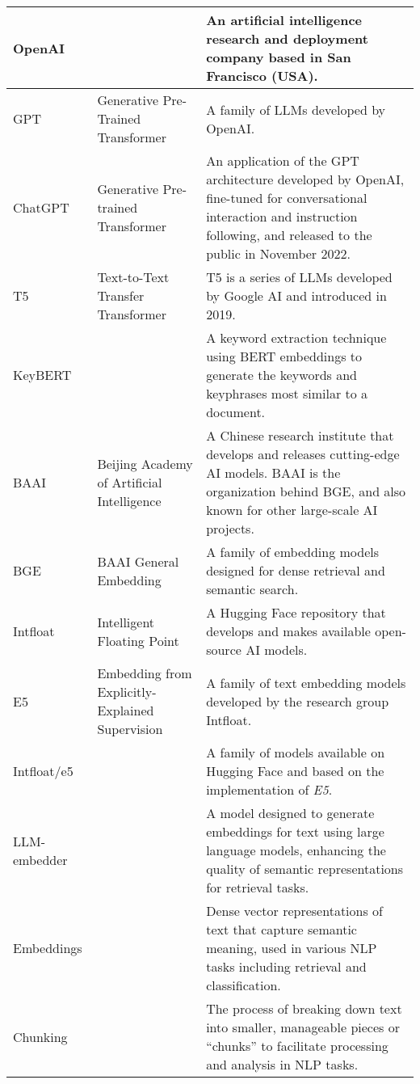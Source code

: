 \begin{tabularx}{\textwidth}{
  >{\raggedright\arraybackslash}p{2.5cm}
  >{\raggedright\arraybackslash}p{4cm}
  >{\noindent\justifying\arraybackslash}X
}
\cmidrule(lr){1-3}
OpenAI & & An artificial intelligence research and deployment company based in San Francisco (USA). \\
\cmidrule(lr){1-3}
GPT   & Generative Pre-Trained Transformer & A family of LLMs developed by OpenAI.\\
\cmidrule(lr){1-3}
ChatGPT & Generative Pre-trained Transformer & An application of the GPT architecture developed by OpenAI, fine-tuned for conversational interaction and instruction following, and released to the public in November 2022. \\
\cmidrule(lr){1-3}
T5    & Text-to-Text Transfer Transformer & T5 is a series of LLMs developed by Google AI and introduced in 2019. \\
\cmidrule(lr){1-3}
KeyBERT & & A keyword extraction technique using BERT embeddings to generate the keywords and keyphrases most similar to a document. \\
\cmidrule(lr){1-3}
BAAI & Beijing Academy of Artificial Intelligence & A Chinese research institute that develops and releases cutting-edge AI models. BAAI is the organization behind BGE, and also known for other large-scale AI projects. \\
\cmidrule(lr){1-3}
BGE   & BAAI General Embedding & A family of embedding models designed for dense retrieval and semantic search. \\
\cmidrule(lr){1-3}
Intfloat & Intelligent Floating Point & A Hugging Face repository that develops and makes available open-source AI models. \\
\cmidrule(lr){1-3}
E5    & Embedding from Explicitly-Explained Supervision & A family of text embedding models developed by the research group Intfloat. \\
\cmidrule(lr){1-3}
Intfloat/e5 & & A family of models available on Hugging Face and based on the implementation of \textit{E5}. \\
\cmidrule(lr){1-3}
LLM-embedder &   & A model designed to generate embeddings for text using large language models, enhancing the quality of semantic representations for retrieval tasks. \\
\cmidrule(lr){1-3}
Embeddings &    & Dense vector representations of text that capture semantic meaning, used in various NLP tasks including retrieval and classification. \\
\cmidrule(lr){1-3}
Chunking &    & The process of breaking down text into smaller, manageable pieces or ``chunks'' to facilitate processing and analysis in NLP tasks. \\

\end{tabularx}
